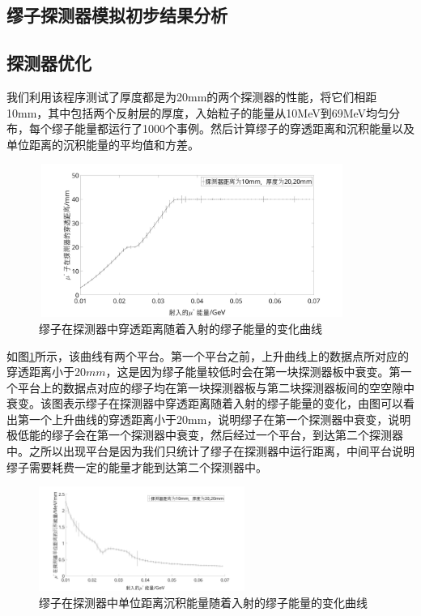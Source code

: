 \documentclass[aps,prd,superscriptaddress,nofootinbib,preprint]{ctexart}
\begin{document}
\begin{CJK}{UTF8}{gbsn}
\section{缪子探测器模拟初步结果分析}
\subsection{探测器优化}

我们利用该程序测试了厚度都是为20mm的两个探测器的性能，将它们相距10mm，其中包括两个反射层的厚度，入始粒子的能量从10MeV到69MeV均匀分布，每个缪子能量都运行了1000个事例。然后计算缪子的穿透距离和沉积能量以及单位距离的沉积能量的平均值和方差。\\

\begin{figure}[H]
    \centering\includegraphics[width=100mm,height=50mm]{pic/de_distant_dis_10_se_20.jpg}
    \caption{缪子在探测器中穿透距离随着入射的缪子能量的变化曲线}\label{di1020}
\end{figure}


如图\ref{di1020}所示，该曲线有两个平台。第一个平台之前，上升曲线上的数据点所对应的穿透距离小于20$mm$，这是因为缪子能量较低时会在第一块探测器板中衰变。第一个平台上的数据点对应的缪子均在第一块探测器板与第二块探测器板间的空空隙中衰变。该图表示缪子在探测器中穿透距离随着入射的缪子能量的变化，由图可以看出第一个上升曲线的穿透距离小于20mm，说明缪子在第一个探测器中衰变，说明极低能的缪子会在第一个探测器中衰变，然后经过一个平台，到达第二个探测器中。之所以出现平台是因为我们只统计了缪子在探测器中运行距离，中间平台说明缪子需要耗费一定的能量才能到达第二个探测器中。


\begin{figure}[H]
    \centering\includegraphics[width=0.6\textwidth]{pic/de_en_di_dis_10_se_20.jpg}
    \caption{缪子在探测器中单位距离沉积能量随着入射的缪子能量的变化曲线}\label{en_di1020}
\end{figure}



\end{CJK}
\end{document}
